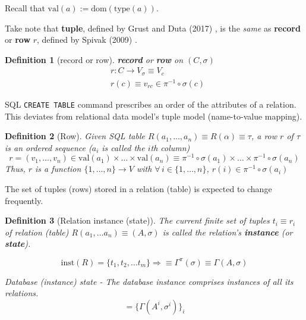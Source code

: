 \documentclass[10pt]{amsart}
\newtheorem{definition}{Definition}
\begin{document}
\begin{multicols*}{2}
Recall that $\text{val}(a) := \text{dom}(\text{type}(a))$.

Take note that \textbf{tuple}, defined by Grust and Duta (2017) \cite{GrDu2017}, is the \emph{same} as \textbf{record} or \textbf{row} $r$, defined by Spivak (2009) \cite{Spiv2009}.

\begin{definition}[record or row]
	\textbf{record} or \textbf{row} on $(C, \sigma)$
	\begin{equation}
	\begin{aligned}
	& r: C \to V_{\sigma} \equiv V_c \\ 
	& r(c) \equiv v_{rc} \in \pi^{-1}\circ \sigma(c)
	\end{aligned}
	\end{equation}
\end{definition} 

SQL \texttt{CREATE TABLE} command prescribes an order of the attributes of a relation. This deviates from relational data model's tuple model (name-to-value mapping).

\begin{definition}[Row]
	Given SQL table $R(a_1, \dots, a_n) \equiv R(\alpha) \equiv \tau$, a row $r$ of $\tau$ is an ordered sequence ($a_i$ is called the $i$th column)
	\begin{equation}
	r = (v_1, \dots, v_n) \in \text{val}(a_1) \times \dots \times \text{val}(a_n) \equiv \pi^{-1} \circ \sigma(a_1) \times \dots \times \pi^{-1} \circ \sigma(a_n)
	\end{equation}
	Thus, $r$ is a function $\lbrace 1, \dots , n \rbrace \to V$ with $\forall \, i \in \lbrace 1 , \dots , n \rbrace$, $r(i) \in \pi^{-1} \circ \sigma(a_i)$
\end{definition}

The set of tuples (rows) stored in a relation (table) is expected to change frequently.

\begin{definition}[Relation instance (state)]
	The current finite set of tuples $t_i \equiv r_i$ of relation (table) $R(a_1, \dots a_n) \equiv (A, \sigma)$ is called the relation's \textbf{instance} (or \textbf{state}).

\[
\text{inst}(R) = \lbrace t_1 , t_2 , \dots t_m \rbrace \Longrightarrow \equiv \Gamma^{\pi}(\sigma) \equiv \Gamma(A, \sigma)
\]

Database (instance) state - The database instance comprises instances of all its relations.
\[
= \lbrace \Gamma(A^i, \sigma^i) \rbrace_i
\]
\end{definition} 


\end{multicols*}
\end{document}

